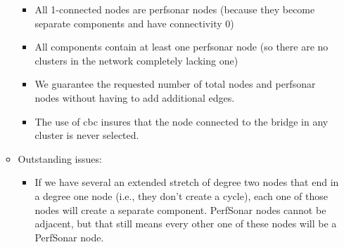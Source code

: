 \documentclass{weeklyreport}
\begin{document}
\begin{itemize}
\begin{itemize}
		\begin{itemize}
			\item All 1-connected nodes are perfsonar nodes (because they become separate components and have connectivity 0)
			\item All components contain at least one perfsonar node (so there are no clusters in the network completely lacking one)
			\item We guarantee the requested number of total nodes and perfsonar nodes without having to add additional edges.
			\item The use of cbc insures that the node connected to the bridge in any cluster is never selected.
		\end{itemize}
		\item Outstanding issues:
		\begin{itemize}
			\item If we have several an extended stretch of degree two nodes that end in a degree one node (i.e., they don't create a cycle), each one of those nodes will create a separate component. PerfSonar nodes cannot be adjacent, but that still means every other one of these nodes will be a PerfSonar node.
		\end{itemize}
    \end{itemize}
\end{itemize}

\subsection*{}
\end{document}
